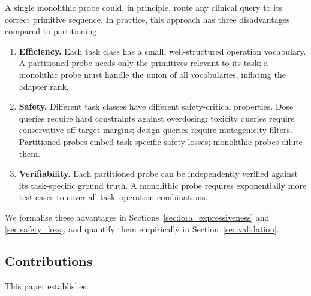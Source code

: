 \documentclass[11pt,twocolumn,a4paper]{article}
\theoremstyle{definition}
\theoremstyle{remark}
\begin{document}
A single monolithic probe could, in principle, route any clinical query to its correct primitive sequence. In practice, this approach has three disadvantages compared to partitioning:

\begin{enumerate}[nosep,leftmargin=*]
\item \textbf{Efficiency.} Each task class has a small, well-structured operation vocabulary. A partitioned probe needs only the primitives relevant to its task; a monolithic probe must handle the union of all vocabularies, inflating the adapter rank.

\item \textbf{Safety.} Different task classes have different safety-critical properties. Dose queries require hard constraints against overdosing; toxicity queries require conservative off-target margins; design queries require mutagenicity filters. Partitioned probes embed task-specific safety losses; monolithic probes dilute them.

\item \textbf{Verifiability.} Each partitioned probe can be independently verified against its task-specific ground truth. A monolithic probe requires exponentially more test cases to cover all task--operation combinations.
\end{enumerate}

We formalise these advantages in Sections~\ref{sec:lora_expressiveness} and \ref{sec:safety_loss}, and quantify them empirically in Section~\ref{sec:validation}.

\subsection{Contributions}

This paper establishes:
\end{document}
